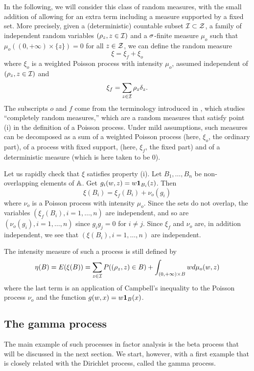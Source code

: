  In the following, we will consider this class of random measures, with the small addition of allowing for an extra term including a measure supported by a fixed set. More precisely, given a (deterministic) countable subset  ${\mathcal I} \subset {\mathcal Z}$, a family of independent random variables $(\rho_z, z\in{\mathcal I})$ and a $\sigma$-finite measure $\mu_o$ such that  $\mu_o((0, +\infty) \times \{z\}) = 0$ for all $z\in {\mathcal Z}$, we can define the random measure
 \[
 \xi = \xi_f + \xi_o
 \]
 where $\xi_o$ is  a weighted Poisson process with intensity $\mu_o$, assumed independent of $(\rho_z, z\in {\mathcal I})$ and
 \[
 \xi_f = \sum_{z\in {\mathcal I}} \rho_z \delta_z.
 \]
 The subscripts $o$ and $f$ come from the terminology introduced in \citet{kingman1967completely}, which studies  ``completely random measures,'' which are a random measures 
that satisfy point (i) in the definition of a Poisson process. Under mild assumptions, such measures can be decomposed as a sum of a weighted Poisson process (here, $\xi_o$, the ordinary part), of a process with fixed support, (here, $\xi_f$, the fixed part) and of a deterministic measure (which is here taken to be 0).

Let us rapidly check that $\xi$ satisfies property (i). Let $B_1, \ldots, B_n$ be non-overlapping elements of ${\mathbb A}$. Get $g_i(w, z) = w {\bm 1}_{B_i}(z)$. Then
\[
\xi(B_i) = \xi_f(B_i) + \nu_o(g_i) 
\]
where $\nu_o$ is a Poisson process with intensity $\mu_o$. Since the sets do not overlap, the variables $(\xi_f(B_i), i=1, \ldots, n)$ are independent, and so are $(\nu_o(g_i), i=1, \ldots, n)$ since $g_ig_j = 0$ for $i\neq j$. Since $\xi_f$ and $\nu_o$ are, in addition independent, we see that $(\xi(B_i), i=1, \ldots, n)$ are independent.

 
 The intensity measure of such a process is still defined by 
\[
\eta(B) = E(\xi(B)) =  \sum_{z\in {\mathcal I}} P( (\rho_z, z) \in B) +  \int_{(0, +\infty)\times B} w d\mu_o(w, z)
\]
where the last term is an application of Campbell's inequality to the Poisson process $\nu_o$ and the function $g(w,x) = w{\bm 1}_B(x)$.



\subsection{The gamma process}
The main example of such processes in factor analysis is the beta process that will be discussed in the next section. We start, however, with a first example that is closely related with the Dirichlet process, called the gamma process.

